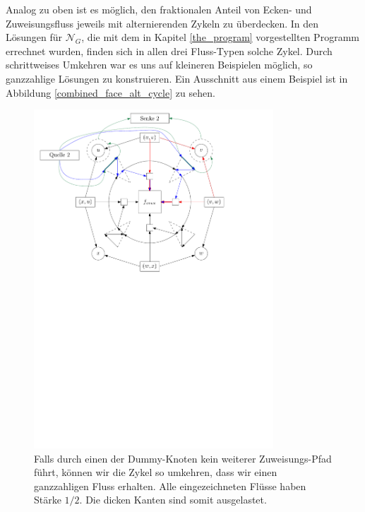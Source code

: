 Analog zu oben ist es möglich, den fraktionalen Anteil von Ecken- und Zuweisungsfluss jeweils mit alternierenden Zykeln zu überdecken. In den Lösungen für $\mathcal{N}_G$, die mit dem in Kapitel \ref{the_program} vorgestellten Programm errechnet wurden, finden sich in allen drei Fluss-Typen solche Zykel. Durch schrittweises Umkehren war es uns auf kleineren Beispielen möglich, so ganzzahlige Lösungen zu konstruieren. Ein Ausschnitt aus einem Beispiel ist in Abbildung \ref{combined_face_alt_cycle} zu sehen.

\begin{figure}[b]
\centering
\includegraphics[width=0.8\textwidth]{combined_face_alt_cycle2.pdf}
\caption{Falls durch einen der Dummy-Knoten kein weiterer Zuweisungs-Pfad führt, können wir die Zykel so umkehren, dass wir einen ganzzahligen Fluss erhalten. Alle eingezeichneten Flüsse haben Stärke $1/2$. Die dicken Kanten sind somit ausgelastet.}
\label{combined_face_alt_cycle2}
\end{figure}


